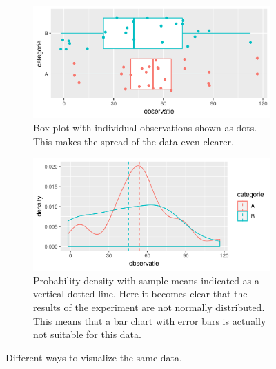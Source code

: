 \begin{figure}
  \begin{subfigure}{.5\textwidth}
    \includegraphics[width=\textwidth]{examples/boxplot-jitter.png}
    \caption{Box plot with individual observations shown as dots. This makes the spread of the data even clearer.}
    \label{fig:boxplot-jitter}
  \end{subfigure}
  \begin{subfigure}{.5\textwidth}
    \includegraphics[width=\textwidth]{examples/density-plot.png}
    \caption{Probability density with sample means indicated as a vertical dotted line. Here it becomes clear that the results of the experiment are not normally distributed. This means that a bar chart with error bars is actually not suitable for this data.}
    \label{fig:density-plot}
  \end{subfigure}
  
 \caption[Visualize number data]{Different ways to visualize the same data.}
\end{figure}

